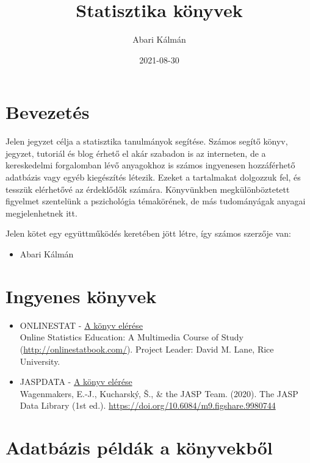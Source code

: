 \documentclass[
]{book}
\title{Statisztika könyvek}
\author{Abari Kálmán}
\date{2021-08-30}
\providecommand{\tightlist}{%
  \setlength{\itemsep}{0pt}\setlength{\parskip}{0pt}}
\begin{document}
\maketitle

{
\setcounter{tocdepth}{1}
\tableofcontents
}
\hypertarget{bevezetuxe9s}{%
\chapter{Bevezetés}\label{bevezetuxe9s}}

Jelen jegyzet célja a statisztika tanulmányok segítése. Számos segítő könyv, jegyzet, tutoriál és blog érhető el akár szabadon is az interneten, de a kereskedelmi forgalomban lévő anyagokhoz is számos ingyenesen hozzáférhető adatbázis vagy egyéb kiegészítés létezik. Ezeket a tartalmakat dolgozzuk fel, és tesszük elérhetővé az érdeklődők számára. Könyvünkben megkülönböztetett figyelmet szentelünk a pszichológia témakörének, de más tudományágak anyagai megjelenhetnek itt.

Jelen kötet egy együttműködés keretében jött létre, így számos szerzője van:

\begin{itemize}
\tightlist
\item
  Abari Kálmán
\end{itemize}

\hypertarget{ingyenes-kuxf6nyvek}{%
\chapter{Ingyenes könyvek}\label{ingyenes-kuxf6nyvek}}

\begin{itemize}
\item
  ONLINESTAT - \href{http://onlinestatbook.com/}{A könyv elérése}\\
  Online Statistics Education: A Multimedia Course of Study (\url{http://onlinestatbook.com/}). Project Leader: David M. Lane, Rice University.
\item
  JASPDATA - \href{https://jasp-stats.org/wp-content/uploads/2020/05/The_JASP_Data_Library_1st_Edition.pdf}{A könyv elérése}\\
  Wagenmakers, E.-J., Kucharský, Š., \& the JASP Team. (2020). The JASP Data Library (1st ed.). \url{https://doi.org/10.6084/m9.figshare.9980744}
\end{itemize}

\hypertarget{adatbuxe1zis-puxe9lduxe1k-a-kuxf6nyvekbux151l}{%
\chapter{Adatbázis példák a könyvekből}\label{adatbuxe1zis-puxe9lduxe1k-a-kuxf6nyvekbux151l}}
\end{document}
